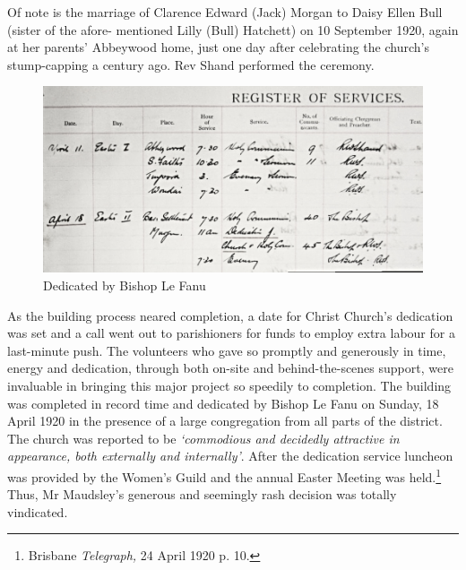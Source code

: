 Of note is the marriage of Clarence Edward (Jack) Morgan to Daisy Ellen Bull (sister of the afore- mentioned Lilly (Bull) Hatchett) on 10 September 1920, again at her parents' Abbeywood home, just one day after celebrating the church's stump-capping a century ago. Rev Shand performed the ceremony.









\begin{figure}[!htb]
\begin{center}
\includegraphics[width=1.\textwidth,center]{../images/dedicationByBishopLeFanu.jpg}
\caption{Dedicated by Bishop Le Fanu}
\end{center}
\end{figure}




As the building process neared completion, a date for Christ Church's dedication was set and a call went out to parishioners for funds to employ extra labour for a last-minute push. The volunteers who gave so promptly and generously in time, energy and dedication, through both on-site and behind-the-scenes support, were invaluable in bringing this major project so speedily to completion. The building was completed in record time and dedicated by Bishop Le Fanu on Sunday, 18 April 1920 in the presence of a large congregation from all parts of the district. The church was reported to be \emph{`commodious and decidedly attractive in appearance, both externally and internally'}. After the dedication service luncheon was provided by the Women's Guild and the annual Easter Meeting was held.\footnote{Brisbane \emph{Telegraph,} 24 April 1920 p. 10.} Thus, Mr Maudsley's generous and seemingly rash decision was totally vindicated.








